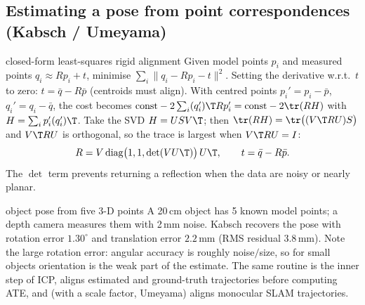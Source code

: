 \subsection{Estimating a pose from point correspondences (Kabsch / Umeyama)}\label{sec:rot:estimating-pose-point}
\begin{deriv}{closed-form least-squares rigid alignment}
Given model points $p_i$ and measured points $q_i\approx Rp_i+t$, minimise $\sum_i\|q_i-Rp_i-t\|^2$. Setting the derivative w.r.t.\ $t$ to zero: $t=\bar q-R\bar p$ (centroids must align). With centred points $p_i'=p_i-\bar p$, $q_i'=q_i-\bar q$, the cost becomes $\text{const}-2\sum_i(q_i')\T Rp_i'=\text{const}-2\tr(RH)$ with $H=\sum_ip_i'(q_i')\T$. Take the SVD $H=USV\T$; then $\tr(RH)=\tr\big((V\T RU)S\big)$ and $V\T RU$ is orthogonal, so the trace is largest when $V\T RU=I$:
\[
R=V\,\mathrm{diag}\big(1,1,\det(VU\T)\big)\,U\T,\qquad t=\bar q-R\bar p.
\]
The $\det$ term prevents returning a reflection when the data are noisy or nearly planar.
\end{deriv}
\begin{example}{object pose from five 3-D points}
A 20\,cm object has 5 known model points; a depth camera measures them with 2\,mm noise. Kabsch recovers the pose with rotation error $1.30^\circ$ and translation error $2.2$\,mm (RMS residual 3.8\,mm). Note the large rotation error: angular accuracy is roughly noise$/$size, so for small objects orientation is the weak part of the estimate. The same routine is the inner step of ICP, aligns estimated and ground-truth trajectories before computing ATE, and (with a scale factor, Umeyama) aligns monocular SLAM trajectories.
\end{example}

